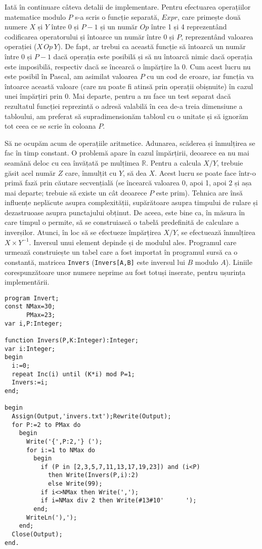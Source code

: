 Iată în continuare câteva detalii de implementare. Pentru efectuarea
operațiilor matematice modulo $P$ s-a scris o funcție separată, $Expr$, care
primește două numere $X$ și $Y$ între 0 și $P-1$ și un număr $Op$ între 1 și 4
reprezentând codificarea operatorului și întoarce un număr între 0 și $P$,
reprezentând valoarea operației ($X\,Op\,Y$). De fapt, ar trebui ca această
funcție să întoarcă un număr între 0 și $P-1$ dacă operația este posibilă și
să nu întoarcă nimic dacă operația este imposibilă, respectiv dacă se încearcă
o împărțire la 0. Cum acest lucru nu este posibil în Pascal, am asimilat
valoarea $P$ cu un cod de eroare, iar funcția va întoarce această valoare
(care nu poate fi atinsă prin operații obișnuite) în cazul unei împărțiri prin
0. Mai departe, pentru a nu face un test separat dacă rezultatul funcției
reprezintă o adresă valabilă în cea de-a treia dimensiune a tabloului, am
preferat să supradimensionăm tabloul cu o unitate și să ignorăm tot ceea ce se
scrie în coloana $P$.

Să ne ocupăm acum de operațiile aritmetice. Adunarea, scăderea și înmulțirea
se fac în timp constant. O problemă apare în cazul împărțirii, deoarece ea nu
mai seamănă deloc cu cea învățată pe mulțimea $\mathbb{R}$. Pentru a calcula
$X/Y$, trebuie găsit acel număr $Z$ care, înmulțit cu $Y$, să dea $X$. Acest
lucru se poate face într-o primă fază prin căutare secvențială (se încearcă
valoarea 0, apoi 1, apoi 2 și așa mai departe; trebuie să existe un cât
deoarece $P$ este prim). Tehnica are însă influențe neplăcute asupra
complexității, supărătoare asupra timpului de rulare și dezastruoase asupra
punctajului obținut. De aceea, este bine ca, în măsura în care timpul o
permite, să se construiască o tabelă predefinită de calculare a
inverșilor. Atunci, în loc să se efectueze împărțirea $X/Y$, se efectuează
înmulțirea $X \times Y^{-1}$. Inversul unui element depinde și de modulul
ales. Programul care urmează construiește un tabel care a fost importat în
programul sursă ca o constantă, matricea {\tt Invers} ({\tt Invers[A,B]} este
inversul lui $B$ modulo $A$). Liniile corespunzătoare unor numere neprime au
fost totuși inserate, pentru ușurința implementării.

\begin{verbatim}
program Invert;
const NMax=30;
      PMax=23;
var i,P:Integer;

function Invers(P,K:Integer):Integer;
var i:Integer;
begin
  i:=0;
  repeat Inc(i) until (K*i) mod P=1;
  Invers:=i;
end;

begin
  Assign(Output,'invers.txt');Rewrite(Output);
  for P:=2 to PMax do
    begin
      Write('{',P:2,'} (');
      for i:=1 to NMax do
        begin
          if (P in [2,3,5,7,11,13,17,19,23]) and (i<P)
            then Write(Invers(P,i):2)
            else Write(99);
          if i<>NMax then Write(',');
          if i=NMax div 2 then Write(#13#10'      ');
        end;
      WriteLn('),');
    end;
  Close(Output);
end.
\end{verbatim}


